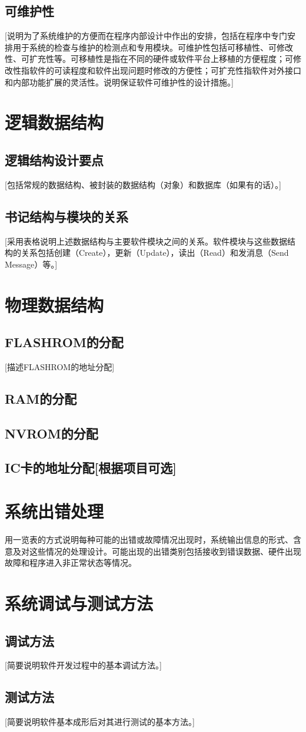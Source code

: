 \documentclass[12pt,a4paper,UTF-8]{ctexart}
\begin{document}
	\subsection{可维护性}
		 [说明为了系统维护的方便而在程序内部设计中作出的安排，包括在程序中专门安排用于系统的检查与维护的检测点和专用模块。可维护性包括可移植性、可修改性、可扩充性等。可移植性是指在不同的硬件或软件平台上移植的方便程度；可修改性指软件的可读程度和软件出现问题时修改的方便性；可扩充性指软件对外接口和内部功能扩展的灵活性。说明保证软件可维护性的设计措施。]
\section{逻辑数据结构}
      	\subsection{逻辑结构设计要点}
		[包括常规的数据结构、被封装的数据结构（对象）和数据库（如果有的话）。]
	\subsection{书记结构与模块的关系}
		[采用表格说明上述数据结构与主要软件模块之间的关系。软件模块与这些数据结构的关系包括创建（Create），更新（Update），读出（Read）和发消息（Send Message）等。]
\section{物理数据结构}
      	\subsection{FLASHROM的分配}
		[描述FLASHROM的地址分配]
	\subsection{RAM的分配}
	\subsection{NVROM的分配}
	\subsection{IC卡的地址分配[根据项目可选]}
\section{系统出错处理}
	用一览表的方式说明每种可能的出错或故障情况出现时，系统输出信息的形式、含意及对这些情况的处理设计。可能出现的出错类别包括接收到错误数据、硬件出现故障和程序进入非正常状态等情况。
\section{系统调试与测试方法}
	\subsection{调试方法}
		[简要说明软件开发过程中的基本调试方法。]
	\subsection{测试方法}
		[简要说明软件基本成形后对其进行测试的基本方法。]
\end{document}
